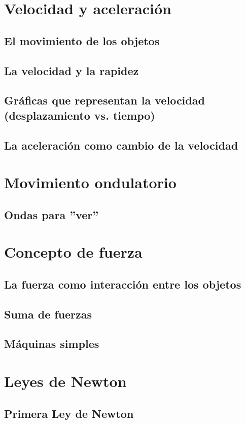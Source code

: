 \documentclass[11pt]{book}
\begin{document}
\section{Velocidad y aceleración}
\subsection{El movimiento de los objetos}
\subsection{La velocidad y la rapidez}
\subsection{Gráficas que representan la velocidad (desplazamiento vs. tiempo)}
\subsection{La aceleración como cambio de la velocidad}

\section{Movimiento ondulatorio}
\subsection{Ondas para ''ver''}

\section{Concepto de fuerza}
\subsection{La fuerza como interacción entre los objetos}
\subsection{Suma de fuerzas}
\subsection{Máquinas simples}

\section{Leyes de Newton}
\subsection{Primera Ley de Newton}
\end{document}
